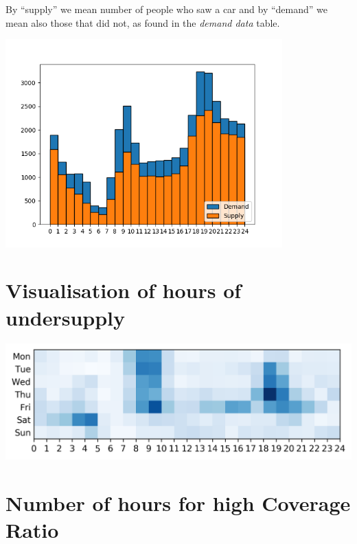 \documentclass[12pt,a4paper]{article}
\begin{document}
    By ``supply'' we mean number of people who saw a car
    and by ``demand'' we mean also those that did not,
    as found in the \emph{demand data} table.
    
    \begin{center}
        \includegraphics[width=0.8\textwidth]{task2/supply-demand}
    \end{center}

    
    
    \section{Visualisation of hours of undersupply}
    
    
    \begin{center}
        \includegraphics[width=1\textwidth]{task3/undersupp_heat}
    \end{center}
    
    
    \section{Number of hours for high Coverage Ratio}
    
\end{document}
